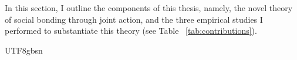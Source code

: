 \begin{CJK}{UTF8}{gbsn}
In this section, I outline the components of this thesis, namely, the novel theory of social bonding through joint action, and the three empirical studies I performed to substantiate this theory (see Table ~\ref{tab:contributions}).




\end{CJK}{UTF8}{gbsn}
